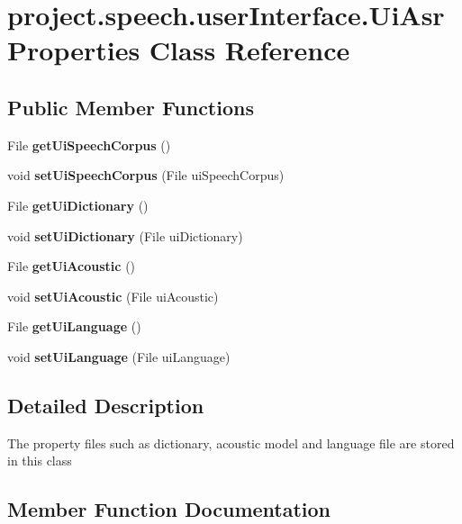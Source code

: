 \section{project.\+speech.\+user\+Interface.\+Ui\+Asr\+Properties Class Reference}
\label{classproject_1_1speech_1_1user_interface_1_1_ui_asr_properties}
\subsection*{Public Member Functions}
\begin{DoxyCompactItemize}
\item 
File {\bf get\+Ui\+Speech\+Corpus} ()
\item 
void {\bf set\+Ui\+Speech\+Corpus} (File ui\+Speech\+Corpus)
\item 
File {\bf get\+Ui\+Dictionary} ()
\item 
void {\bf set\+Ui\+Dictionary} (File ui\+Dictionary)
\item 
File {\bf get\+Ui\+Acoustic} ()
\item 
void {\bf set\+Ui\+Acoustic} (File ui\+Acoustic)
\item 
File {\bf get\+Ui\+Language} ()
\item 
void {\bf set\+Ui\+Language} (File ui\+Language)
\end{DoxyCompactItemize}


\subsection{Detailed Description}
The property files such as dictionary, acoustic model and language file are stored in this class 

\subsection{Member Function Documentation}
